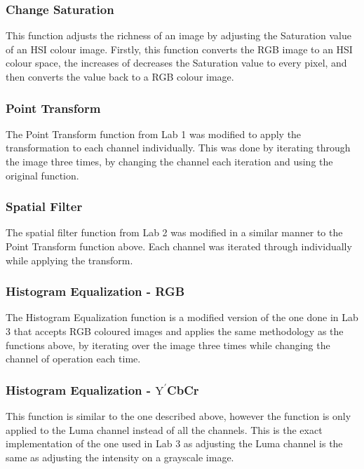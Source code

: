 \documentclass{article}
\begin{document}
	\subsubsection{Change Saturation}
	
	This function adjusts the richness of an image by adjusting the Saturation value of an HSI colour image. Firstly, this function converts the RGB image to an HSI colour space, the increases of decreases the Saturation value to every pixel, and then converts the value back to a RGB colour image.\\

	\subsubsection{Point Transform}

	The Point Transform function from Lab 1 was modified to apply the transformation to each channel individually. This was done by iterating through the image three times, by changing the channel each iteration and using the original function.\\
	
	\subsubsection{Spatial Filter}
	
	The spatial filter function from Lab 2 was modified in a similar manner to the Point Transform function above. Each channel was iterated through individually while applying the transform.\\
	
	\subsubsection{Histogram Equalization - RGB}
	
	The Histogram Equalization function is a modified version of the one done in Lab 3 that accepts RGB coloured images and applies the same methodology as the functions above, by iterating over the image three times while changing the channel of operation each time.\\
	
	\subsubsection{Histogram Equalization - $\textrm{Y}^\prime$CbCr}
	
	This function is similar to the one described above, however the function is only applied to the Luma channel instead of all the channels. This is the exact implementation of the one used in Lab 3 as adjusting the Luma channel is the same as adjusting the intensity on a grayscale image.\\
	
\end{document}
